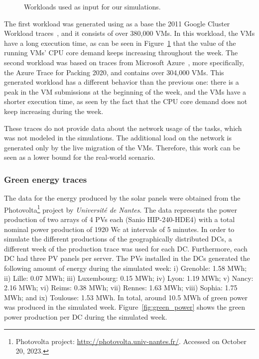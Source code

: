 \begin{figure}[h]
  \centering
   {}
  \caption{Workloads used as input for our simulations.}
  \label{fig:workload}
 \end{figure}

The first workload was generated using as a base the 2011 Google Cluster Workload traces~\cite{google2011traces}, and it consists of over 380,000 VMs. In this workload, the VMs have a long execution time, as can be seen in Figure~\ref{fig:workload} that the value of the running VMs' CPU core demand keeps increasing throughout the week. The second workload was based on traces from Microsoft Azure~\cite{hadary2020protean}, more specifically, the Azure Trace for Packing 2020, and contains over 304,000 VMs. This generated workload has a different behavior than the previous one: there is a peak in the VM submissions at the beginning of the week, and the VMs have a shorter execution time, as seen by the fact that the CPU core demand does not keep increasing during the week.

These traces do not provide data about the network usage of the tasks, which was not modeled in the simulations. The additional load on the network is generated only by the live migration of the VMs. Therefore, this work can be seen as a lower bound for the real-world scenario.


\subsubsection{Green energy traces}

The data for the energy produced by the solar panels were obtained from the Photovolta\footnote{Photovolta project: \url{http://photovolta.univ-nantes.fr/}. Accessed on October 20, 2023.} project by \textit{Université de Nantes}. The data represents the power production of two arrays of 4 PVs each (Sanio HIP-240-HDE4) with a total nominal power production of 1920 Wc at intervals of 5 minutes. In order to simulate the different productions of the geographically distributed DCs,  a different week of the production trace was used for each DC. Furthermore, each DC had three PV panels per server. The PVs installed in the DCs generated the following amount of energy during the simulated week: i) Grenoble: 1.58 MWh; ii) Lille: 0.07 MWh; iii) Luxembourg: 0.15 MWh; iv) Lyon: 1.19 MWh; v) Nancy: 2.16 MWh; vi) Reims: 0.38 MWh; vii) Rennes: 1.63 MWh; viii) Sophia: 1.75 MWh; and ix) Toulouse: 1.53 MWh. In total, around 10.5 MWh of green power was produced in the simulated week. Figure~\ref{fig:green_power} shows the green power production per DC during the simulated week.


